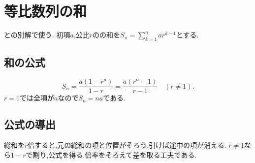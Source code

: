 
\section{等比数列の和}\label{節：等比数列の総和とその導出}
  との別解で使う.
  初項$a$,公比$r$のの和を$S_n=\sum_{k=1}^n ar^{k-1}$とする.

  \subsection{和の公式}\label{節：等比数列の総和とその導出：総和の公式}
    \[
      S_n=\frac{a(1-r^n)}{1-r}=\frac{a(r^n-1)}{r-1}
      \quad(r\ne1).
    \]
    $r=1$では全項が$a$なので$S_n=na$である.

  \subsection{公式の導出}\label{節：等比数列の総和とその導出：公式の導出}
    総和を$r$倍すると,元の総和の項と位置がそろう.引けば途中の項が消える.
\BookMathLayout{\[
    \begin{array}{rrrl}
        &S_n={}&a+&\hspace{-0.75em}ar+ar^2+\cdots+ar^{n-1}\\
      -\,) &rS_n={}&{}&\hspace{-0.75em}ar+ar^2+ar^3+\cdots+ar^n\\ \hline
        &(1-r)S_n={}&{}&\hspace{-0.75em}a-ar^n
    \end{array}
    \]}{
\[
\begin{array}{rl}
S_n={}&a+ar+ar^2+\cdots\\
     &{}+ar^{n-1}\\
-\,)\ rS_n={}&ar+ar^2+ar^3+\cdots\\
     &{}+ar^n\\ \hline
(1-r)S_n={}&a-ar^n
\end{array}
\]
}
    $r\ne1$なら$1-r$で割り,公式を得る.倍率をそろえて差を取る工夫である.
